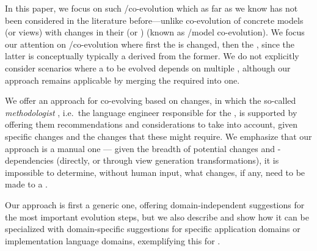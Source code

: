 In this paper, we focus on such \metamodel/\viewtype co-evolution which as far as we know has not been considered in the literature before---unlike co-evolution of concrete models (or views) with changes in their \metamodel (or \viewtype)
(known as \metamodel/model co-evolution).
We focus our attention on \metamodel/\viewtype co-evolution where first the \metamodel is changed, then the \viewtype, since the latter is conceptually typically a \metamodel derived from the former. %
We do not explicitly consider scenarios where a \viewtype to be evolved depends on multiple \metamodels, although our approach remains applicable by merging the required \metamodels into one. %

We offer an approach for co-evolving \viewtypes based on \metamodel changes, in which the so-called \textit{methodologist} \cite{atkinson_orthographic_2010}, i.e.~the language engineer responsible for the \viewtype, is supported by offering them recommendations and considerations to take into account, given specific \metamodel changes and the \viewtype changes that these might require. We emphasize that our approach is a manual one --- given the breadth of potential \metamodel changes and \viewtypes-\metamodel dependencies (directly, or through view generation transformations), it is impossible to determine, without human input, what changes, if any, need to be made to a \viewtype.

Our approach is first a generic one, offering domain-independent suggestions for the most important \metamodel evolution steps, but we also describe and show how it can be specialized with domain-specific suggestions for specific application domains or implementation language domains, exemplifying  this for .

